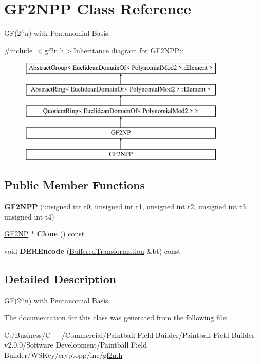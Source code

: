 \hypertarget{class_g_f2_n_p_p}{
\section{GF2NPP Class Reference}
\label{class_g_f2_n_p_p}
}


GF(2$^\wedge$n) with Pentanomial Basis.  


{\ttfamily \#include $<$gf2n.h$>$}Inheritance diagram for GF2NPP::\begin{figure}[H]
\begin{center}
\leavevmode
\includegraphics[height=5cm]{class_g_f2_n_p_p}
\end{center}
\end{figure}
\subsection*{Public Member Functions}
\begin{DoxyCompactItemize}
\item 
\hypertarget{class_g_f2_n_p_p_a6d42a20e16bee4bd4f36245686becd94}{
{\bfseries GF2NPP} (unsigned int t0, unsigned int t1, unsigned int t2, unsigned int t3, unsigned int t4)}
\label{class_g_f2_n_p_p_a6d42a20e16bee4bd4f36245686becd94}

\item 
\hypertarget{class_g_f2_n_p_p_a890272bf19035e7c4190e17d23d3349a}{
\hyperlink{class_g_f2_n_p}{GF2NP} $\ast$ {\bfseries Clone} () const }
\label{class_g_f2_n_p_p_a890272bf19035e7c4190e17d23d3349a}

\item 
\hypertarget{class_g_f2_n_p_p_a445e0bad66f415b138a220893dbc7167}{
void {\bfseries DEREncode} (\hyperlink{class_buffered_transformation}{BufferedTransformation} \&bt) const }
\label{class_g_f2_n_p_p_a445e0bad66f415b138a220893dbc7167}

\end{DoxyCompactItemize}


\subsection{Detailed Description}
GF(2$^\wedge$n) with Pentanomial Basis. 

The documentation for this class was generated from the following file:\begin{DoxyCompactItemize}
\item 
C:/Business/C++/Commercial/Paintball Field Builder/Paintball Field Builder v2.0.0/Software Development/Paintball Field Builder/WSKey/cryptopp/inc/\hyperlink{gf2n_8h}{gf2n.h}\end{DoxyCompactItemize}
